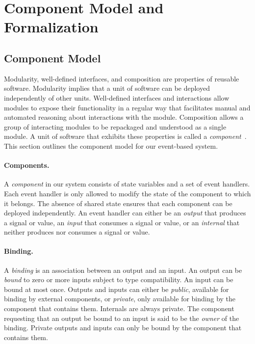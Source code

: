 \section{Component Model and Formalization\label{system_model}}

\subsection{Component Model}

Modularity, well-defined interfaces, and composition are properties of reusable software.
Modularity implies that a unit of software can be deployed independently of other units.
Well-defined interfaces and interactions allow modules to expose their functionality in a regular way that facilitates manual and automated reasoning about interactions with the module.
Composition allows a group of interacting modules to be repackaged and understood as a single module.
A unit of software that exhibits these properties is called a \emph{component}~\cite{szyperski2002component}.
This section outlines the component model for our event-based system.

\paragraph{Components.}
A \emph{component} in our system consists of state variables and a set of event handlers.
Each event handler is only allowed to modify the state of the component to which it belongs.
The absence of shared state ensures that each component can be deployed independently.
An event handler can either be an \emph{output} that produces a signal or value, an \emph{input} that consumes a signal or value, or an \emph{internal} that neither produces nor consumes a signal or value.

\paragraph{Binding.}
A \emph{binding} is an association between an output and an input.
An output can be \emph{bound} to zero or more inputs subject to type compatibility.
An input can be bound at most once.
Outputs and inputs can either be \emph{public}, available for binding by external components, or \emph{private}, only available for binding by the component that contains them.
Internals are always private.
The component requesting that an output be bound to an input is said to be the \emph{owner} of the binding.
Private outputs and inputs can only be bound by the component that contains them.

